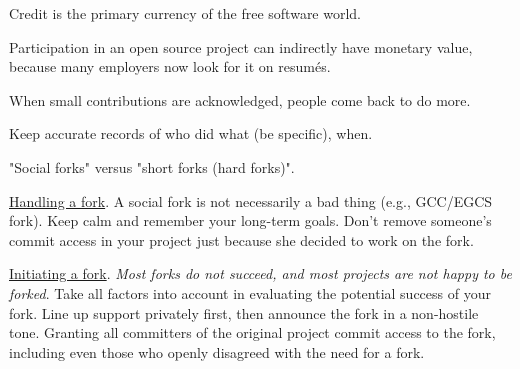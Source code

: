 \documentclass[landscape,30pt]{foils}
\begin{document}

Credit is the primary currency of the free software world.

Participation in an open source project can indirectly have monetary value, because many employers now look for it on resumés.

When small contributions are acknowledged, people come back to do more.

Keep accurate records of who did what (be specific), when.


"Social forks" versus "short forks (hard forks)".

\underline{Handling a fork}.  A social fork is not necessarily a bad thing (e.g., GCC/EGCS fork). Keep calm and remember your long-term goals.  Don't remove someone's commit access in your project just because she decided to work on the fork.

\underline{Initiating a fork}.  {\em Most forks do not succeed, and most projects are not happy to be forked}.  Take all factors into account in evaluating the potential success of your fork.  Line up support privately first, then announce the fork in a non-hostile tone.  Granting all committers of the original project commit access to the fork, including even those who openly disagreed with the need for a fork. 
\end{document}
